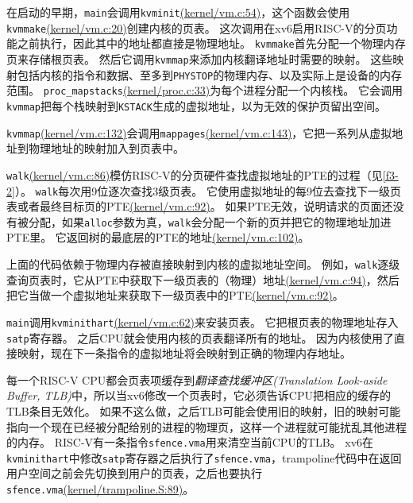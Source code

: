在启动的早期，\texttt{main}会调用\texttt{kvminit}\href{https://github.com/mit-pdos/xv6-riscv/blob/risc/kernel/vm.c#L54}{(kernel/vm.c:54)}，这个函数会使用\texttt{kvmmake}\href{https://github.com/mit-pdos/xv6-riscv/blob/risc/kernel/vm.c#L20}{(kernel/vm.c:20)}创建内核的页表。
这次调用在xv6启用RISC-V的分页功能之前执行，因此其中的地址都直接是物理地址。
\texttt{kvmmake}首先分配一个物理内存页来存储根页表。
然后它调用\texttt{kvmmap}来添加内核翻译地址时需要的映射。
这些映射包括内核的指令和数据、至多到\texttt{PHYSTOP}的物理内存、以及实际上是设备的内存范围。
\texttt{proc\_mapstacks}\href{https://github.com/mit-pdos/xv6-riscv/blob/risc/kernel/proc.c#L33}{(kernel/proc.c:33)}为每个进程分配一个内核栈。
它会调用\texttt{kvmmap}把每个栈映射到\texttt{KSTACK}生成的虚拟地址，以为无效的保护页留出空间。

\texttt{kvmmap}\href{https://github.com/mit-pdos/xv6-riscv/blob/risc/kernel/vm.c#L132}{(kernel/vm.c:132)}会调用\texttt{mappages}\href{https://github.com/mit-pdos/xv6-riscv/blob/risc/kernel/vm.c#L143}{(kernel/vm.c:143)}，它把一系列从虚拟地址到物理地址的映射加入到页表中。

\texttt{walk}\href{https://github.com/mit-pdos/xv6-riscv/blob/risc/kernel/vm.c#L86}{(kernel/vm.c:86)}模仿RISC-V的分页硬件查找虚拟地址的PTE的过程（见\autoref{f3-2}）。
\texttt{walk}每次用9位逐次查找3级页表。
它使用虚拟地址的每9位去查找下一级页表或者最终目标页的PTE\href{https://github.com/mit-pdos/xv6-riscv/blob/risc/kernel/vm.c#L92}{(kernel/vm.c:92)}。
如果PTE无效，说明请求的页面还没有被分配，如果\texttt{alloc}参数为真，\texttt{walk}会分配一个新的页并把它的物理地址加进PTE里。
它返回树的最底层的PTE的地址\href{https://github.com/mit-pdos/xv6-riscv/blob/risc/kernel/vm.c#L102}{(kernel/vm.c:102)}。

上面的代码依赖于物理内存被直接映射到内核的虚拟地址空间。
例如，\texttt{walk}逐级查询页表时，它从PTE中获取下一级页表的（物理）地址\href{https://github.com/mit-pdos/xv6-riscv/blob/risc/kernel/vm.c#L94}{(kernel/vm.c:94)}，然后把它当做一个虚拟地址来获取下一级页表中的PTE\href{https://github.com/mit-pdos/xv6-riscv/blob/risc/kernel/vm.c#L92}{(kernel/vm.c:92)}。

\texttt{main}调用\texttt{kvminithart}\href{https://github.com/mit-pdos/xv6-riscv/blob/risc/kernel/vm.c#L62}{(kernel/vm.c:62)}来安装页表。
它把根页表的物理地址存入\texttt{satp}寄存器。
之后CPU就会使用内核的页表翻译所有的地址。
因为内核使用了直接映射，现在下一条指令的虚拟地址将会映射到正确的物理内存地址。

每一个RISC-V CPU都会页表项缓存到\emph{翻译查找缓冲区(Translation Look-aside Buffer, TLB)}中，所以当xv6修改一个页表时，它必须告诉CPU把相应的缓存的TLB条目无效化。
如果不这么做，之后TLB可能会使用旧的映射，旧的映射可能指向一个现在已经被分配给别的进程的物理页，这样一个进程就可能扰乱其他进程的内存。
RISC-V有一条指令\texttt{sfence.vma}用来清空当前CPU的TLB。
xv6在\texttt{kvminithart}中修改\texttt{satp}寄存器之后执行了\texttt{sfence.vma}，trampoline代码中在返回用户空间之前会先切换到用户的页表，之后也要执行\texttt{sfence.vma}\href{https://github.com/mit-pdos/xv6-riscv/blob/risc/kernel/trampoline.S#L89}{(kernel/trampoline.S:89)}。

